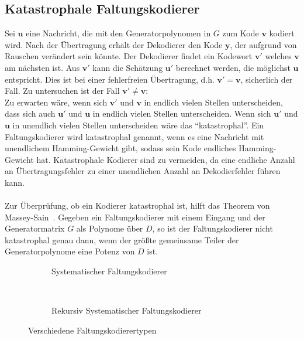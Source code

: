 \subsection{Katastrophale Faltungskodierer}
\label{kapitel:grundlagen_katastrophale_kodierer}
Sei $\mathbf{u}$ eine Nachricht, die mit den Generatorpolynomen in $G$ zum Kode $\mathbf{v}$ kodiert wird. Nach der Übertragung erhält der Dekodierer den Kode $\mathbf{y}$, der aufgrund von Rauschen verändert sein könnte. Der Dekodierer findet ein Kodewort $\mathbf{v'}$ welches $\mathbf{v}$ am nächsten ist. Aus $\mathbf{v'}$ kann die Schätzung $\mathbf{u'}$ berechnet werden, die möglichst $\mathbf{u}$ entspricht. Dies ist bei einer fehlerfreien Übertragung, d.h. $\mathbf{v'}=\mathbf{v}$, sicherlich der Fall. Zu untersuchen ist der Fall $\mathbf{v'}\neq\mathbf{v}$:\\
Zu erwarten wäre, wenn sich $\mathbf{v'}$ und $\mathbf{v}$ in endlich vielen Stellen unterscheiden, dass sich auch $\mathbf{u'}$ und $\mathbf{u}$ in endlich vielen Stellen unterscheiden. Wenn sich $\mathbf{u'}$ und $\mathbf{u}$ in unendlich vielen Stellen unterscheiden wäre das \enquote{katastrophal}. Ein Faltungskodierer wird katastrophal genannt, wenn es eine Nachricht mit unendlichem Hamming-Gewicht gibt, sodass sein Kode endliches Hamming-Gewicht hat. Katastrophale Kodierer sind zu vermeiden, da eine endliche Anzahl an Übertragungsfehler zu einer unendlichen Anzahl an Dekodierfehler führen kann. \cite[S. 569]{huffman2010fundamentals}
\\
\\
Zur Überprüfung, ob ein Kodierer katastrophal ist, hilft das Theorem von Massey-Sain~\cite[S. 570]{huffman2010fundamentals}. Gegeben ein Faltungskodierer mit einem Eingang und der Generatormatrix $G$ als Polynome über $D$, so ist der Faltungskodierer nicht katastrophal genau dann, wenn der größte gemeinsame Teiler der Generatorpolynome eine Potenz von $D$ ist.
\begin{figure}[t]
	\centering
	\begin{subfigure}{0.45\textwidth}
		\centering
		\resizebox{0.90\textwidth}{!}{%
			
		}
		\caption{Systematischer Faltungskodierer}
		\label{abb:systematischer_kodierer}
	\end{subfigure}
	~ %
	\begin{subfigure}{0.45\textwidth}
		\centering
		\resizebox{0.99\textwidth}{!}{%
			
		}
		\caption{Rekursiv Systematischer Faltungskodierer}
		\label{abb:rsc_kodierer}
	\end{subfigure}
\caption{Verschiedene Faltungskodierertypen}
\label{abb:faltungskodierer_typen}
\end{figure}


